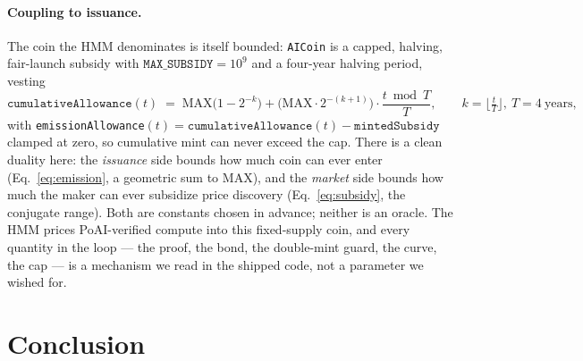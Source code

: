 \documentclass[11pt]{article}
\newcommand{\code}[1]{\texttt{#1}}
\begin{document}
\paragraph{Coupling to issuance.} The coin the HMM denominates is itself bounded:
\code{AICoin} is a capped, halving, fair-launch subsidy with
$\code{MAX\_SUBSIDY}=10^9$ and a four-year halving period, vesting
\begin{equation}
\code{cumulativeAllowance}(t) \;=\; \mathrm{MAX}\big(1-2^{-k}\big)
   + \big(\mathrm{MAX}\cdot 2^{-(k+1)}\big)\cdot\frac{t \bmod T}{T},
   \qquad k=\Big\lfloor \tfrac{t}{T}\Big\rfloor,\ T = 4\ \text{years},
\label{eq:emission}
\end{equation}
with \code{emissionAllowance}$(t)=\code{cumulativeAllowance}(t)-\code{mintedSubsidy}$
clamped at zero, so cumulative mint can never exceed the cap. There is a clean
duality here: the \emph{issuance} side bounds how much coin can ever enter
(Eq.~\eqref{eq:emission}, a geometric sum to $\mathrm{MAX}$), and the \emph{market}
side bounds how much the maker can ever subsidize price discovery
(Eq.~\eqref{eq:subsidy}, the conjugate range). Both are constants chosen in
advance; neither is an oracle. The HMM prices PoAI-verified compute into this
fixed-supply coin, and every quantity in the loop --- the proof, the bond, the
double-mint guard, the curve, the cap --- is a mechanism we read in the shipped
code, not a parameter we wished for.

\section{Conclusion}
\label{sec:conclusion}
\end{document}
